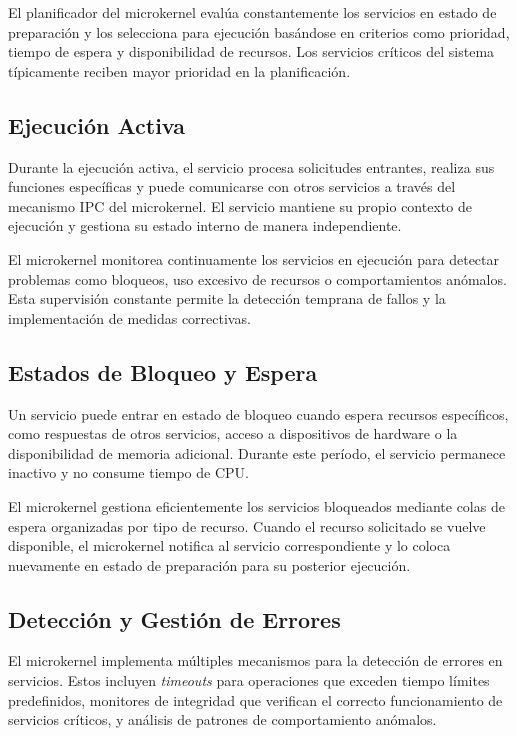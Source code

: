 \documentclass[12pt,a4paper]{article}
\begin{document}
El planificador del microkernel evalúa constantemente los servicios en estado de preparación y los selecciona para ejecución basándose en criterios como prioridad, tiempo de espera y disponibilidad de recursos. Los servicios críticos del sistema típicamente reciben mayor prioridad en la planificación.

\subsection{Ejecución Activa}

Durante la ejecución activa, el servicio procesa solicitudes entrantes, realiza sus funciones específicas y puede comunicarse con otros servicios a través del mecanismo IPC del microkernel. El servicio mantiene su propio contexto de ejecución y gestiona su estado interno de manera independiente.

El microkernel monitorea continuamente los servicios en ejecución para detectar problemas como bloqueos, uso excesivo de recursos o comportamientos anómalos. Esta supervisión constante permite la detección temprana de fallos y la implementación de medidas correctivas.

\subsection{Estados de Bloqueo y Espera}

Un servicio puede entrar en estado de bloqueo cuando espera recursos específicos, como respuestas de otros servicios, acceso a dispositivos de hardware o la disponibilidad de memoria adicional. Durante este período, el servicio permanece inactivo y no consume tiempo de CPU.

El microkernel gestiona eficientemente los servicios bloqueados mediante colas de espera organizadas por tipo de recurso. Cuando el recurso solicitado se vuelve disponible, el microkernel notifica al servicio correspondiente y lo coloca nuevamente en estado de preparación para su posterior ejecución.

\subsection{Detección y Gestión de Errores}

El microkernel implementa múltiples mecanismos para la detección de errores en servicios. Estos incluyen \textit{timeouts} para operaciones que exceden tiempo límites predefinidos, monitores de integridad que verifican el correcto funcionamiento de servicios críticos, y análisis de patrones de comportamiento anómalos.
\end{document}
